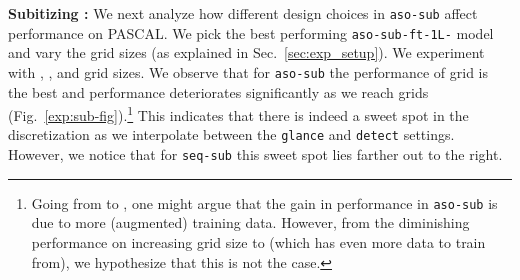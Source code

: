\documentclass[10pt,twocolumn,letterpaper]{article}
\newcommand{\detect}{\texttt{detect}\xspace}
\newcommand{\sub}{\texttt{aso-sub}\xspace}
\newcommand{\seq}{\texttt{seq-sub}\xspace}
\newcommand{\glance}{\texttt{glance}\xspace}
\newcommand{\pascal}{PASCAL\xspace}
\newcommand{\refsec}[1]{Sec.~\ref{#1}}
\begin{document}
\par \noindent
\textbf{Subitizing : }We next analyze how different design choices in \sub{} affect performance on \pascal. We pick the best performing \sub{}\texttt{-ft-1L-} model and vary the grid sizes (as explained in \refsec{sec:exp_setup}). We experiment with , , and  grid sizes. We observe that for \sub the performance of  grid is the best and performance deteriorates significantly as we reach  grids (Fig.~\ref{exp:sub-fig}).\footnote{Going from  to , one might argue that the gain in performance in \sub is due to more (augmented) training data. However, from the diminishing performance on increasing grid size to  (which has even more data to train from), we hypothesize that this is not the case.} This indicates that there is indeed a sweet spot in the discretization as we interpolate between the \glance{} and \detect{} settings. However, we notice that for \seq this sweet spot lies farther out to the right.
\end{document}
